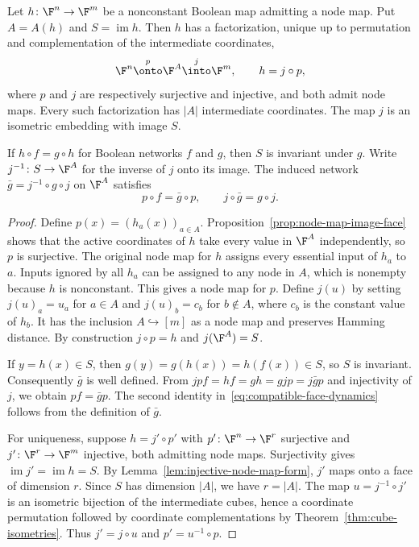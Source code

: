 \begin{theorem}\label{thm:compatible-face-factorization}
Let $h\colon\F^n\to\F^m$ be a nonconstant Boolean map admitting a node map. Put $A=A(h)$ and $S=\operatorname{im}h$. Then $h$ has a factorization, unique up to permutation and complementation of the intermediate coordinates,
\begin{equation}\label{eq:compatible-face-factorization}
    \F^n\overset{p}{\onto}\F^A\overset{j}{\into}\F^m,
    \qquad h=j\circ p,
\end{equation}
where $p$ and $j$ are respectively surjective and injective, and both admit node maps. Every such factorization has $|A|$ intermediate coordinates. The map $j$ is an isometric embedding with image $S$.

If $h\circ f=g\circ h$ for Boolean networks $f$ and $g$, then $S$ is invariant under $g$. Write $j^{-1}\colon S\to\F^A$ for the inverse of $j$ onto its image. The induced network $\bar g=j^{-1}\circ g\circ j$ on $\F^A$ satisfies
\begin{equation}\label{eq:compatible-face-dynamics}
    p\circ f=\bar g\circ p,
    \qquad
    j\circ\bar g=g\circ j.
\end{equation}
\end{theorem}

\begin{proof}
Define $p(x)=(h_a(x))_{a\in A}$. Proposition~\ref{prop:node-map-image-face} shows that the active coordinates of $h$ take every value in $\F^A$ independently, so $p$ is surjective. The original node map for $h$ assigns every essential input of $h_a$ to $a$. Inputs ignored by all $h_a$ can be assigned to any node in $A$, which is nonempty because $h$ is nonconstant. This gives a node map for $p$. Define $j(u)$ by setting $j(u)_a=u_a$ for $a\in A$ and $j(u)_b=c_b$ for $b\notin A$, where $c_b$ is the constant value of $h_b$. It has the inclusion $A\hookrightarrow[m]$ as a node map and preserves Hamming distance. By construction $j\circ p=h$ and $j(\F^A)=S$.

If $y=h(x)\in S$, then $g(y)=g(h(x))=h(f(x))\in S$, so $S$ is invariant. Consequently $\bar g$ is well defined. From $jpf=hf=gh=gjp=j\bar g p$ and injectivity of $j$, we obtain $pf=\bar g p$. The second identity in~\eqref{eq:compatible-face-dynamics} follows from the definition of $\bar g$.

For uniqueness, suppose $h=j'\circ p'$ with $p'\colon\F^n\to\F^r$ surjective and $j'\colon\F^r\to\F^m$ injective, both admitting node maps. Surjectivity gives $\operatorname{im}j'=\operatorname{im}h=S$. By Lemma~\ref{lem:injective-node-map-form}, $j'$ maps onto a face of dimension $r$. Since $S$ has dimension $|A|$, we have $r=|A|$. The map $u=j^{-1}\circ j'$ is an isometric bijection of the intermediate cubes, hence a coordinate permutation followed by coordinate complementations by Theorem~\ref{thm:cube-isometries}. Thus $j'=j\circ u$ and $p'=u^{-1}\circ p$.
\end{proof}

